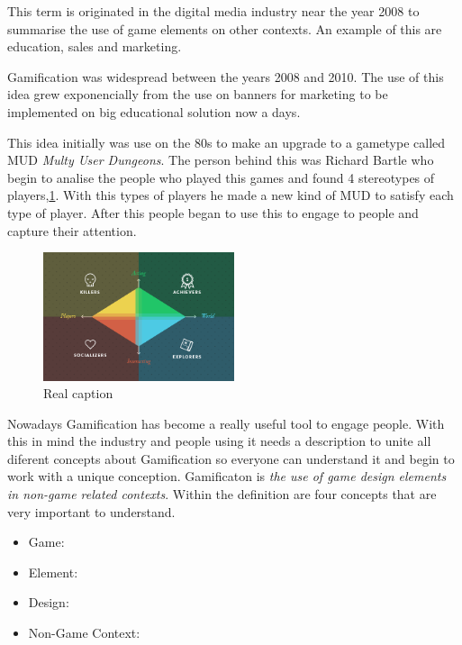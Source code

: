 This term is originated in the digital media industry near the year 2008
 \cite{DefineGamefication} to summarise the use of game elements on other
contexts. An example of this are education, sales and marketing. 

Gamification was widespread between the years 2008 and 2010. The use of 
this idea grew exponencially from the use on banners for marketing to be implemented
on big educational solution now a days.

This idea initially was use on the 80s to make an upgrade to a gametype called MUD
\emph{Multy User Dungeons}. The person behind this was Richard Bartle who begin to
analise the people who played this games and found 4 stereotypes of players,\ref{fig:Players}.
With this types of players he made a new kind of MUD to satisfy each type of player. After this
people began to use this to engage to people and capture their attention. 

\begin{figure}[!htb]
  \centering
  \includegraphics[width=0.5\textwidth]{images/TypeOfPlayersBartle.png}
  \caption[Caption for LOF]{Real caption\footnotemark}
  \label{fig:Players}
\end{figure}

 	

Nowadays Gamification has become a really useful tool to engage people. With this in mind
the industry and people using it needs a description to unite all diferent concepts
about Gamification so everyone can understand it and begin to work with a unique conception.
Gamificaton is \emph{the use of game design elements in non-game related contexts}. 
Within the definition are four concepts that are very important to understand.

\begin{itemize}

\item Game:

\item Element:

\item Design:

\item Non-Game Context:

\end{itemize}

